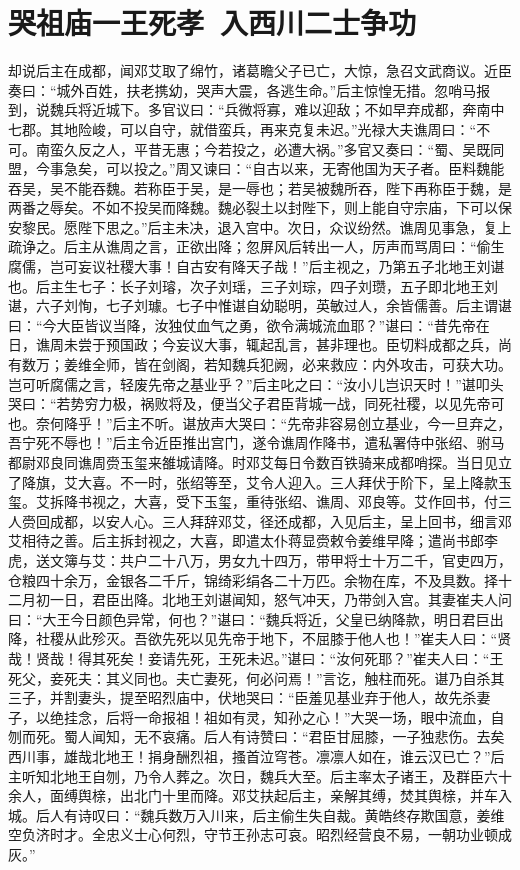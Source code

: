 \chapter{哭祖庙一王死孝~入西川二士争功}

却说后主在成都，闻邓艾取了绵竹，诸葛瞻父子已亡，大惊，急召文武商议。近臣奏曰：“城外百姓，扶老携幼，哭声大震，各逃生命。”后主惊惶无措。忽哨马报到，说魏兵将近城下。多官议曰：“兵微将寡，难以迎敌；不如早弃成都，奔南中七郡。其地险峻，可以自守，就借蛮兵，再来克复未迟。”光禄大夫谯周曰：“不可。南蛮久反之人，平昔无惠；今若投之，必遭大祸。”多官又奏曰：“蜀、吴既同盟，今事急矣，可以投之。”周又谏曰：“自古以来，无寄他国为天子者。臣料魏能吞吴，吴不能吞魏。若称臣于吴，是一辱也；若吴被魏所吞，陛下再称臣于魏，是两番之辱矣。不如不投吴而降魏。魏必裂土以封陛下，则上能自守宗庙，下可以保安黎民。愿陛下思之。”后主未决，退入宫中。次日，众议纷然。谯周见事急，复上疏诤之。后主从谯周之言，正欲出降；忽屏风后转出一人，厉声而骂周曰：“偷生腐儒，岂可妄议社稷大事！自古安有降天子哉！”后主视之，乃第五子北地王刘谌也。后主生七子：长子刘璿，次子刘瑶，三子刘琮，四子刘瓒，五子即北地王刘谌，六子刘恂，七子刘璩。七子中惟谌自幼聪明，英敏过人，余皆儒善。后主谓谌曰：“今大臣皆议当降，汝独仗血气之勇，欲令满城流血耶？”谌曰：“昔先帝在日，谯周未尝于预国政；今妄议大事，辄起乱言，甚非理也。臣切料成都之兵，尚有数万；姜维全师，皆在剑阁，若知魏兵犯阙，必来救应：内外攻击，可获大功。岂可听腐儒之言，轻废先帝之基业乎？”后主叱之曰：“汝小儿岂识天时！”谌叩头哭曰：“若势穷力极，祸败将及，便当父子君臣背城一战，同死社稷，以见先帝可也。奈何降乎！”后主不听。谌放声大哭曰：“先帝非容易创立基业，今一旦弃之，吾宁死不辱也！”后主令近臣推出宫门，遂令谯周作降书，遣私署侍中张绍、驸马都尉邓良同谯周赍玉玺来雒城请降。时邓艾每日令数百铁骑来成都哨探。当日见立了降旗，艾大喜。不一时，张绍等至，艾令人迎入。三人拜伏于阶下，呈上降款玉玺。艾拆降书视之，大喜，受下玉玺，重待张绍、谯周、邓良等。艾作回书，付三人赍回成都，以安人心。三人拜辞邓艾，径还成都，入见后主，呈上回书，细言邓艾相待之善。后主拆封视之，大喜，即遣太仆蒋显赍敕令姜维早降；遣尚书郎李虎，送文簿与艾：共户二十八万，男女九十四万，带甲将士十万二千，官吏四万，仓粮四十余万，金银各二千斤，锦绮彩绢各二十万匹。余物在库，不及具数。择十二月初一日，君臣出降。北地王刘谌闻知，怒气冲天，乃带剑入宫。其妻崔夫人问曰：“大王今日颜色异常，何也？”谌曰：“魏兵将近，父皇已纳降款，明日君巨出降，社稷从此殄灭。吾欲先死以见先帝于地下，不屈膝于他人也！”崔夫人曰：“贤哉！贤哉！得其死矣！妾请先死，王死未迟。”谌曰：“汝何死耶？”崔夫人曰：“王死父，妾死夫：其义同也。夫亡妻死，何必问焉！”言讫，触柱而死。谌乃自杀其三子，并割妻头，提至昭烈庙中，伏地哭曰：“臣羞见基业弃于他人，故先杀妻子，以绝挂念，后将一命报祖！祖如有灵，知孙之心！”大哭一场，眼中流血，自刎而死。蜀人闻知，无不哀痛。后人有诗赞曰：“君臣甘屈膝，一子独悲伤。去矣西川事，雄哉北地王！捐身酬烈祖，搔首泣穹苍。凛凛人如在，谁云汉已亡？”后主听知北地王自刎，乃令人葬之。次日，魏兵大至。后主率太子诸王，及群臣六十余人，面缚舆榇，出北门十里而降。邓艾扶起后主，亲解其缚，焚其舆榇，并车入城。后人有诗叹曰：“魏兵数万入川来，后主偷生失自裁。黄皓终存欺国意，姜维空负济时才。全忠义士心何烈，守节王孙志可哀。昭烈经营良不易，一朝功业顿成灰。”

